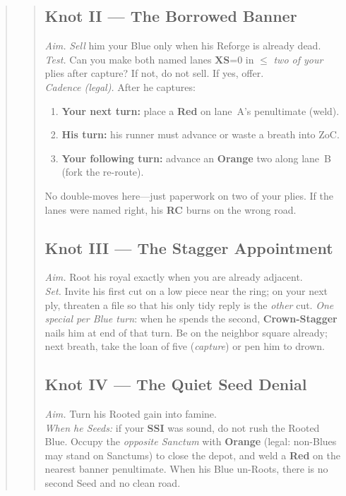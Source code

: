 \documentclass[11pt]{article}
\begin{document}
\begin{quote}
\begin{quote}
\subsection*{Knot II --- The Borrowed Banner}
\emph{Aim.} \emph{Sell} him your Blue only when his Reforge is already dead.\\
\emph{Test.} Can you make both named lanes \textbf{XS}=0 in \(\le\) \emph{two of your} plies after capture? If not, do not sell. If yes, offer.\\
\emph{Cadence (legal).} After he captures:
\begin{enumerate}\itemsep0.15em
  \item \textbf{Your next turn:} place a \textbf{Red} on lane~A's penultimate (weld).
  \item \textbf{His turn:} his runner must advance or waste a breath into ZoC.
  \item \textbf{Your following turn:} advance an \textbf{Orange} two along lane~B (fork the re-route).
\end{enumerate}
No double-moves here---just paperwork on two of your plies. If the lanes were named right, his \textbf{RC} burns on the wrong road.

\subsection*{Knot III --- The Stagger Appointment}
\emph{Aim.} Root his royal exactly when you are already adjacent.\\
\emph{Set.} Invite his first cut on a low piece near the ring; on your next ply, threaten a file so that his only tidy reply is the \emph{other} cut. \emph{One special per Blue turn}: when he spends the second, \textbf{Crown-Stagger} nails him at end of that turn. Be on the neighbor square already; next breath, take the loan of five (\emph{capture}) or pen him to drown.

\subsection*{Knot IV --- The Quiet Seed Denial}
\emph{Aim.} Turn his Rooted gain into famine.\\
\emph{When he Seeds:} if your \textbf{SSI} was sound, do not rush the Rooted Blue. Occupy the \emph{opposite Sanctum} with \textbf{Orange} (legal: non-Blues may stand on Sanctums) to close the depot, and weld a \textbf{Red} on the nearest banner penultimate. When his Blue un-Roots, there is no second Seed and no clean road.


\end{quote}
\end{quote}
\end{document}
